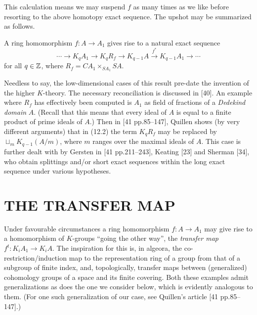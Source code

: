 This calculation means we may suspend $f$ as many times as we like before resorting to the
above homotopy exact sequence. The upshot may be summarized as follows.
\begin{theorem}
A ring homomorphism $f \colon   A \longrightarrow  A_1$ gives rise to a natural exact sequence
\[\cdots \longrightarrow K_qA_1\longrightarrow K_qR_f\longrightarrow K_{q-1}A\overset{f^*}{\longrightarrow} K_{q-1}A_1\longrightarrow \cdots\]
for all $q\in \mathbb{Z}$, where $R_f = CA_1 \times_{SA_1}SA$.
\end{theorem}
Needless to say, the low-dimensional cases of this result pre-date the invention of the higher $K$-theory. The necessary reconciliation is discussed in [40]. An example where $R_f$ has effectively been computed is $A_1$ as field of fractions of a {\em Dedekind domain} $A$. (Recall that this means that every ideal of $A$ is equal to a finite product of prime ideals of $A$.) Then in [41 pp.85--147], Quillen shows (by very different arguments) that in (12.2) the term $K_qR_f$ may be replaced by
$\sqcup_{m} K_{q-1}(A/m)$, where $m$ ranges over the maximal ideals of $A$. This case is further dealt with by Gersten in [41 pp.211--243], Keating [23] and Sherman [34], who obtain splittings and/or short exact sequences within the long exact sequence under various hypotheses.
\section*{THE TRANSFER MAP}
Under favourable circumstances a ring homomorphism $f\colon   A \longrightarrow A_1$ may give rise to a homomorphism of $K$-groups ``going the other way'', the {\em transfer map} $f^t \colon   K_iA_1 \longrightarrow  K_iA$. The inspiration for this is, in algeora, the co-restriction/induction map to the representation ring of a group from
that of a subgroup of finite index, and, topologically, transfer maps between (generalized) cohomology groups of a space and its finite covering. Both these examples admit generalizations as does the one we consider below, which is evidently analogous to them. (For one such generalization of our case, see Quillen's article [41 pp.85--147].)

